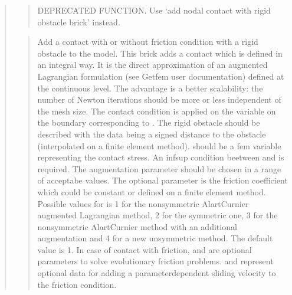 \documentclass[a4paper,11pt,english]{sphinxmanual}
\begin{document}
\begin{quote}
\begin{quote}
\sphinxAtStartPar
DEPRECATED FUNCTION. Use ‘add nodal contact with rigid obstacle brick’ instead.
\end{quote}

\sphinxAtStartPar
{}
\begin{quote}

\sphinxAtStartPar
Add a contact with or without friction condition with a rigid obstacle
to the model. This brick adds a contact which is defined
in an integral way. It is the direct approximation of an augmented
Lagrangian formulation (see Getfem user documentation) defined at the
continuous level. The advantage is a better scalability: the number of
Newton iterations should be more or less independent of the mesh size.
The contact condition is applied on the variable 
on the boundary corresponding to . The rigid obstacle should
be described with the data  being a signed distance to
the obstacle (interpolated on a finite element method).
 should be a fem variable representing the contact stress.
An inf\sphinxhyphen{}sup condition beetween  and  is required.
The augmentation parameter  should be chosen in a
range of acceptabe values.
The optional parameter  is the friction
coefficient which could be constant or defined on a finite element method.
Possible values for  is 1 for the non\sphinxhyphen{}symmetric Alart\sphinxhyphen{}Curnier
augmented Lagrangian method, 2 for the symmetric one, 3 for the
non\sphinxhyphen{}symmetric Alart\sphinxhyphen{}Curnier method with an additional augmentation
and 4 for a new unsymmetric method. The default value is 1.
In case of contact with friction,  and 
are optional parameters to solve evolutionary friction problems.
 and  represent optional data for adding
a parameter\sphinxhyphen{}dependent sliding velocity to the friction condition.
\end{quote}


\end{quote}
\end{document}
